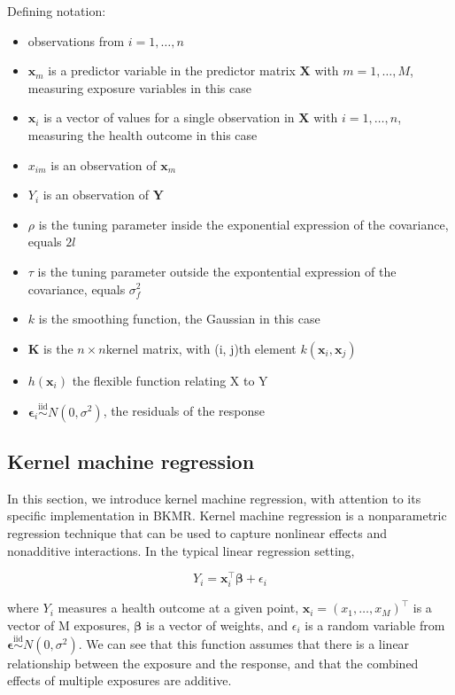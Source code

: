 \documentclass[12pt, twoside]{amherstthesis}
\providecommand{\tightlist}{%
  \setlength{\itemsep}{0pt}\setlength{\parskip}{0pt}}
\begin{document}
Defining notation:
\begin{itemize}
\tightlist
\item
  observations from \(i = 1, \dots ,n\)
\item
  \(\textbf{x}_m\) is a predictor variable in the predictor matrix \(\textbf{X}\) with \(m = 1, \dots, M\), measuring exposure variables in this case
\item
  \(\textbf{x}_i\) is a vector of values for a single observation in \(\textbf{X}\) with \(i = 1, \dots, n\), measuring the health outcome in this case
\item
  \(x_{im}\) is an observation of \(\textbf{x}_m\)
\item
  \(Y_i\) is an observation of \(\textbf{Y}\)
\item
  \(\rho\) is the tuning parameter inside the exponential expression of the covariance, equals \(2l\)
\item
  \(\tau\) is the tuning parameter outside the expontential expression of the covariance, equals \(\sigma_f^2\)
\item
  \(k\) is the smoothing function, the Gaussian in this case
\item
  \(\textbf{K}\) is the \(n \times n\)kernel matrix, with (i, j)th element \(k(\textbf{x}_i, \textbf{x}_j)\)
\item
  \(h(\textbf{x}_i)\) the flexible function relating X to Y
\item
  \(\boldsymbol\epsilon_i \overset{\mathrm{iid}}{\sim} N(0, \sigma^2)\), the residuals of the response
\end{itemize}
\hypertarget{kernel-machine-regression}{%
\subsection{Kernel machine regression}\label{kernel-machine-regression}}

In this section, we introduce kernel machine regression, with attention to its specific implementation in BKMR. Kernel machine regression is a nonparametric regression technique that can be used to capture nonlinear effects and nonadditive interactions. In the typical linear regression setting,

\[
Y_i = \textbf{x}_i^\top\boldsymbol{\beta} + \epsilon_i
\]

\noindent where \(Y_i\) measures a health outcome at a given point, \(\textbf{x}_i = (x_{1},\dots,x_{M})^\top\) is a vector of M exposures, \(\boldsymbol{\beta}\) is a vector of weights, and \(\epsilon_i\) is a random variable from \(\boldsymbol\epsilon \overset{\mathrm{iid}}{\sim} N(0, \sigma^2)\). We can see that this function assumes that there is a linear relationship between the exposure and the response, and that the combined effects of multiple exposures are additive.
\end{document}
